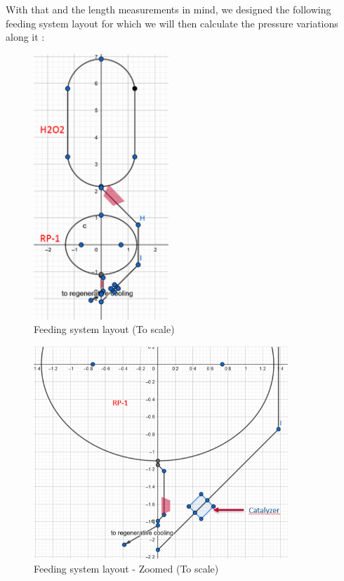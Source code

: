 With that and the length measurements in mind, we designed the following feeding system layout for which we will then calculate the pressure variations along it :
\begin{figure}[H]
	\centering
	\includegraphics[height=10cm]{feeding}
	\caption{Feeding system layout (To scale)}
\end{figure}
\begin{figure}[H]
	\centering
	\includegraphics[height=8cm]{feedingzoom}
	\caption{Feeding system layout - Zoomed (To scale)}
\end{figure}
